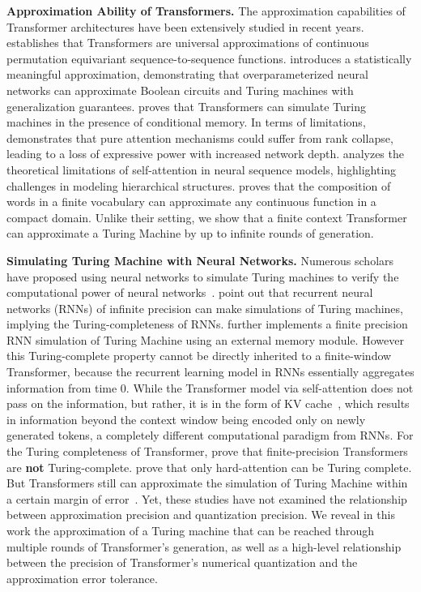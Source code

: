 \textbf{Approximation Ability of Transformers.} The approximation capabilities of Transformer architectures have been extensively studied in recent years. \citet{yuntransformers} establishes that Transformers are universal approximations of continuous permutation equivariant sequence-to-sequence functions. \cite{wei2022statistically} introduces a statistically meaningful approximation, demonstrating that overparameterized neural networks can approximate Boolean circuits and Turing machines with generalization guarantees. \citet{schuurmans2023memory} proves that Transformers can simulate Turing machines in the presence of conditional memory. In terms of limitation{\color{black}s}, \citet{dong2021attention} demonstrates that pure attention mechanisms could suffer from rank collapse, leading to a loss of expressive power with increased network depth. \citet{hahn2020theoretical} analyzes the theoretical limitations of self-attention in neural sequence models, highlighting challenges in modeling hierarchical structures. %
\cite{caivocabulary} proves that the composition of words in a finite vocabulary can approximate any continuous function in a compact domain. Unlike their setting, we show that a finite context Transformer can approximate a Turing Machine by up to infinite rounds of generation.

{\color{black}
\textbf{Simulating Turing Machine with Neural Networks.} Numerous scholars have proposed using neural networks to simulate Turing machines to verify the computational power of neural networks~\citep{siegelmann1992computational,perez2021attention,perez2019turing,wei2022statistically,graves2014neural}. \cite{siegelmann1992computational} point out that recurrent neural networks (RNNs) of infinite precision can make simulations of Turing machines, implying the Turing-completeness of RNNs. \cite{chung2021turing} further implements a finite precision RNN simulation of Turing Machine using an external memory module. However this Turing-complete property cannot be directly inherited to a finite-window Transformer, because the recurrent learning model in RNNs essentially aggregates information from time 0. While the Transformer model via self-attention does not pass on the information, but rather, it is in the form of KV cache~\citep{gemodel}, which results in information beyond the context window being encoded only on newly generated tokens, a completely different computational paradigm from RNNs. For the Turing completeness of Transformer, \cite{bhattamishra2020computational} prove that finite-precision Transformers are \textbf{not} Turing-complete. \cite{perez2021attention} prove that only hard-attention can be Turing complete. But Transformers still can approximate the simulation of Turing Machine within a certain margin of error~\citep{wei2022statistically}.
Yet, these studies have not examined the relationship between approximation precision and quantization precision. We reveal in this work the approximation of a Turing machine that can be reached through multiple rounds of Transformer's generation, as well as a high-level relationship between the precision of Transformer's numerical quantization and the approximation error tolerance.
}


